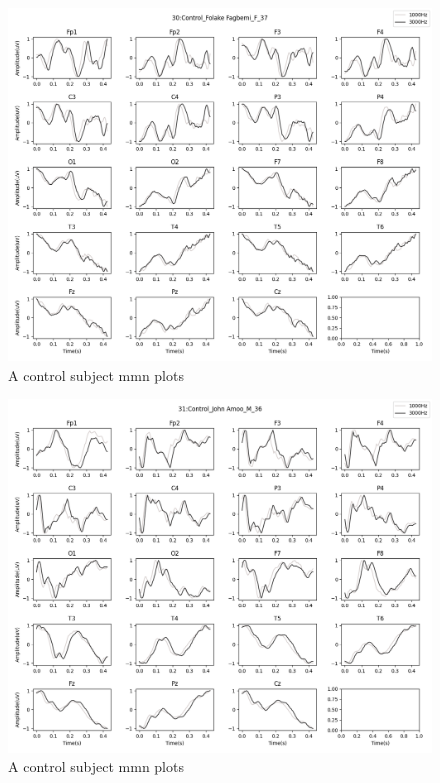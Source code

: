 \documentclass[10pt]{article}
\begin{document}
\begin{figure}[H]
  \includegraphics[width=16cm]{../../../data_analysis_results/MMN/time_series/Control/30.png}
  \caption{A control subject \gls{mmn} plots}
\end{figure}
\begin{figure}[H]
  \includegraphics[width=16cm]{../../../data_analysis_results/MMN/time_series/Control/31.png}
  \caption{A control subject \gls{mmn} plots}
\end{figure}
\end{document}

